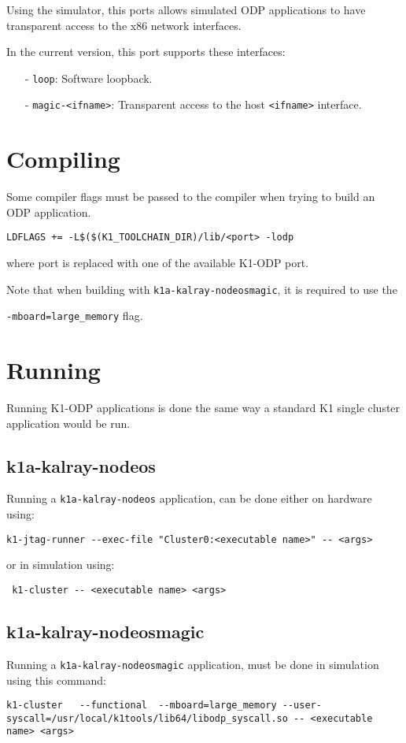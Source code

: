 \documentclass{trkalray}
\begin{document}
Using the simulator, this ports allows simulated ODP applications to
have transparent access to the x86 network interfaces.

In the current version, this port supports these interfaces:
\begin{itemize}
\item[-]{\texttt{loop}: Software loopback.}
\item[-]{\texttt{magic-<ifname>}: Transparent access to the host
  \texttt{<ifname>} interface.}
\end{itemize}

\section{Compiling}

Some compiler flags must be passed to the compiler when trying to
build an ODP application.

\begin{lstlisting}
LDFLAGS += -L$($(K1_TOOLCHAIN_DIR)/lib/<port> -lodp
\end{lstlisting}
where port is replaced with one of the available K1-ODP port.

Note that when building with \texttt{k1a-kalray-nodeosmagic}, it is
required to use the

 \texttt{-mboard=large\_memory} flag.

\section{Running}

Running K1-ODP applications is done the same way a standard K1 single
cluster application would be run.

\subsection{k1a-kalray-nodeos}
Running a \texttt{k1a-kalray-nodeos} application, can be done either
on hardware using:
\begin{lstlisting}
k1-jtag-runner --exec-file "Cluster0:<executable name>" -- <args>
\end{lstlisting}
or in simulation using:
\begin{lstlisting}
 k1-cluster -- <executable name> <args>
\end{lstlisting}

\subsection{k1a-kalray-nodeosmagic}
Running a \texttt{k1a-kalray-nodeosmagic} application, must be done in
simulation using this command:
\begin{lstlisting}
k1-cluster   --functional  --mboard=large_memory --user-syscall=/usr/local/k1tools/lib64/libodp_syscall.so -- <executable name> <args>
\end{lstlisting}
\end{document}
